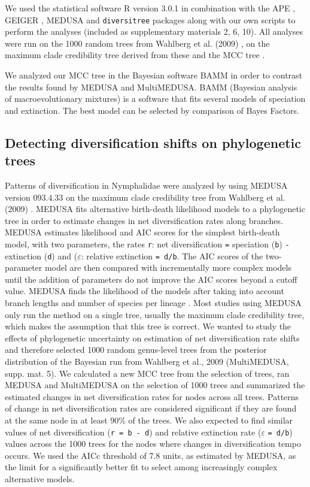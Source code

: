 \documentclass[10pt]{article}
\begin{document}
We used the statistical software R version 3.0.1 \cite{r2013} in combination
with the APE \cite{popescu2012}, GEIGER \cite{harmon2008}, MEDUSA
\cite{alfaro2009} and
\texttt{diversitree} \cite{fitzjohn2012} packages along with our own scripts to
perform the analyses (included as supplementary materials 2, 6, 10). All
analyses were run on the 1000 random trees from Wahlberg et al. (2009)
\cite{wahlberg2009}, on the maximum clade credibility tree derived from these and
the MCC tree \cite{wahlberg2009}.

We analyzed our MCC tree in the Bayesian software BAMM in order to
contrast the results found by MEDUSA and MultiMEDUSA. BAMM (Bayesian
analysis of macroevolutionary mixtures) \cite{rabosky2014} is a software that fits
several models of speciation and extinction. The best model can be
selected by comparison of Bayes Factors.

\subsection*{Detecting diversification shifts on phylogenetic trees}

Patterns of diversification in Nymphalidae were analyzed by using MEDUSA
version 093.4.33 \cite{alfaro2009} on the maximum clade credibility tree from
Wahlberg et al. (2009) \cite{wahlberg2009}. MEDUSA fits alternative birth-death
likelihood models to a phylogenetic tree in order to estimate changes in
net diversification rates along branches. MEDUSA estimates likelihood
and AIC scores for the simplest birth-death model, with two parameters,
the rates \texttt{r}: net diversification \texttt{=} speciation
(\texttt{b}) \texttt{-} extinction (\texttt{d}) and (\(\varepsilon\):
relative extinction \texttt{= d/b}. The AIC scores of the two-parameter
model are then compared with incrementally more complex models until the
addition of parameters do not improve the AIC scores beyond a cutoff
value. MEDUSA finds the likelihood of the models after taking into
account branch lengths and number of species per lineage \cite{alfaro2009}. Most
studies using MEDUSA only run the method on a single tree, usually the
maximum clade credibility tree, which makes the assumption that this
tree is correct. We wanted to study the effects of phylogenetic
uncertainty on estimation of net diversification rate shifts and
therefore selected 1000 random genus-level trees from the posterior
distribution of the Bayesian run from Wahlberg et al., 2009 \cite{wahlberg2009}
(MultiMEDUSA, supp. mat. 5). We calculated a new MCC tree from the
selection of trees, ran MEDUSA and MultiMEDUSA on the selection of 1000
trees and summarized the estimated changes in net diversification rates
for nodes across all trees. Patterns of change in net diversification
rates are considered significant if they are found at the same node in
at least 90\% of the trees. We also expected to find similar values of
net diversification (\texttt{r = b - d}) and relative extinction rate
(\(\varepsilon\) \texttt{= d/b}) values across the 1000 trees for the
nodes where changes in diversification tempo occurs. We used the AICc
threshold of 7.8 units, as estimated by MEDUSA, as the limit for a
significantly better fit to select among increasingly complex
alternative models.
\end{document}
